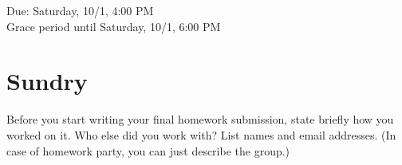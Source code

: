 \documentclass[11pt]{article}
\begin{document}
\maketitle
\fontsize{12}{15}\selectfont

\begin{center}
    Due: Saturday, 10/1, 4:00 PM \\
    Grace period until Saturday, 10/1, 6:00 PM \\
\end{center}

\section*{Sundry}
Before you start writing your final homework submission, state briefly how you worked on it.  Who else did you work with?  List names and email addresses.  (In case of homework party, you can just describe the group.)

{\color{blue}{I did not work with anybody on this homework. I went to office hours on Thursday and Friday to ask for clarification on problems 3, 5, and 6, but did not work with anybody there.}}
\vspace{15pt}

\end{document}
